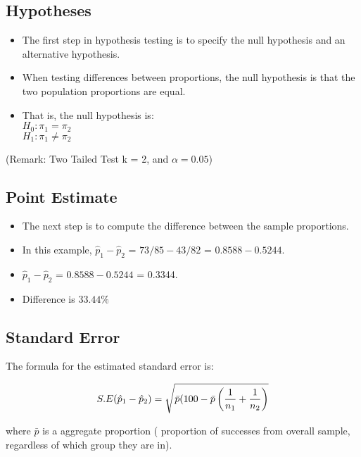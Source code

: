 \documentclass[a4paper,12pt]{article}
\begin{document}
\subsection*{Hypotheses}
\begin{itemize}
\item
The first step in hypothesis testing is to specify the null hypothesis and an alternative hypothesis.
\item When testing differences between proportions, the null hypothesis is that the two population proportions are equal.
\item That is, the null hypothesis is:\\
$H_0: \pi_1 = \pi_2$\\
$H_1: \pi_1 \neq \pi_2$\\
\end{itemize}
(Remark: Two Tailed Test k = 2, and $\alpha = 0.05$)


\subsection*{Point Estimate}
\begin{itemize}
\item The next step is to compute the difference between the sample proportions.
\item In this example, $\hat{p}_1 - \hat{p}_2$ = $73/85 - 43/82$ = $0.8588 - 0.5244$.
\item $\hat{p}_1 - \hat{p}_2$ = $0.8588 - 0.5244$ = 0.3344.
\item Difference is $33.44\%$
\end{itemize}





\subsection*{Standard Error}
The formula for the estimated standard error is:

\[ S.E (\hat{p}_1 - \hat{p}_2)  = \sqrt{\bar{p}(100- \bar{p} \left( {1 \over n_1} + {1 \over n_2}  \right)} \]


where $\bar{p}$ is a aggregate proportion ( proportion of successes from overall sample, regardless of which group they are in).
\end{document}
